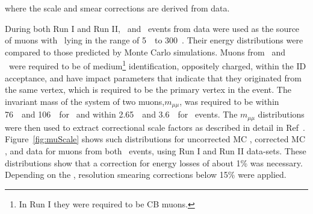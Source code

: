 where the scale and smear corrections are derived from data. 

\par During both Run I and Run II, \Jmm\ and \Zmm\ events from data were used as the source of muons with \pT\ lying in the range 
of 5~\GeV\ to 300~\GeV. Their energy distributions were compared to those predicted by Monte Carlo simulations. 
Muons from \Jmm\ and \Zmm\ were required to be of medium\footnote{In Run I they were required to be CB muons.} 
identification, oppositely charged, within the ID acceptance, and have impact parameters 
that indicate that they originated from the same vertex, which is required to be the primary 
vertex in the event. The invariant mass of the system of two muons,$m_{\mu\mu}$, was required to 
be within 76~\GeV\ and 106~\GeV\ for \Zmm\ and within 2.65~\GeV\ and 3.6~\GeV\ for \Jmm\ events. 
The $m_{\mu\mu}$ distributions were then used to extract correctional scale factors as described in detail in Ref~\cite{Aad:2016jkr}.
Figure~\ref{fig:muScale} shows such distributions for uncorrected MC \pT, 
corrected MC \pT, and data \pT for muons from both \Jmm\ events, using Run I and Run II data-sets. 
These distributions show that a correction for energy losses of about 1\% was necessary. Depending on 
the \pt, resolution smearing corrections below 15\% were applied.     

